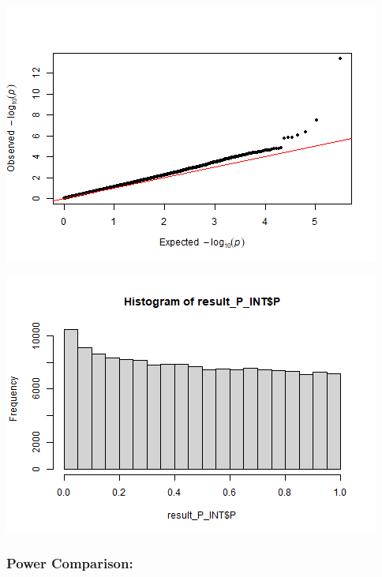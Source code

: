 \documentclass[
]{article}
\newenvironment{Shaded}{\begin{snugshade}}{\end{snugshade}}
\newcommand{\DataTypeTok}[1]{\textcolor[rgb]{0.13,0.29,0.53}{#1}}
\newcommand{\DecValTok}[1]{\textcolor[rgb]{0.00,0.00,0.81}{#1}}
\newcommand{\KeywordTok}[1]{\textcolor[rgb]{0.13,0.29,0.53}{\textbf{#1}}}
\newcommand{\NormalTok}[1]{#1}
\newcommand{\OperatorTok}[1]{\textcolor[rgb]{0.81,0.36,0.00}{\textbf{#1}}}
\begin{document}
\includegraphics{stats-gene-research-progress-v9_files/figure-latex/unnamed-chunk-7-2.png}

\begin{Shaded}
\end{Shaded}

\includegraphics{stats-gene-research-progress-v9_files/figure-latex/unnamed-chunk-7-3.png}

\clearpage

\hypertarget{power-comparison-1}{%
\subsubsection{Power Comparison:}\label{power-comparison-1}}
\end{document}
